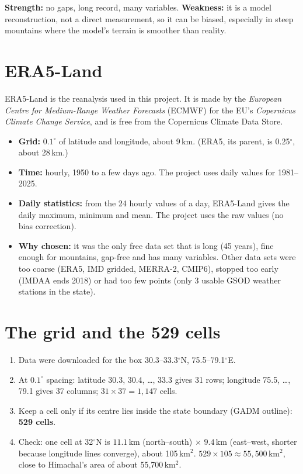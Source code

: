 \textbf{Strength:} no gaps, long record, many variables. \textbf{Weakness:} it is a model reconstruction, not a direct
measurement, so it can be biased, especially in steep mountains where the model's terrain is smoother than reality.

\section{ERA5-Land}
ERA5-Land is the reanalysis used in this project. It is made by the \emph{European Centre for Medium-Range Weather
Forecasts} (ECMWF) for the EU's \emph{Copernicus Climate Change Service}, and is free from the Copernicus Climate Data
Store.
\begin{itemize}
  \item \textbf{Grid:} $0.1^\circ$ of latitude and longitude, about 9\,km. (ERA5, its parent, is 0.25$^\circ$, about
        28\,km.)
  \item \textbf{Time:} hourly, 1950 to a few days ago. The project uses daily values for 1981--2025.
  \item \textbf{Daily statistics:} from the 24 hourly values of a day, ERA5-Land gives the daily maximum, minimum and
        mean. The project uses the raw values (no bias correction).
  \item \textbf{Why chosen:} it was the only free data set that is long (45 years), fine enough for mountains, gap-free
        and has many variables. Other data sets were too coarse (ERA5, IMD gridded, MERRA-2, CMIP6), stopped too early
        (IMDAA ends 2018) or had too few points (only 3 usable GSOD weather stations in the state).
\end{itemize}

\section{The grid and the 529 cells}
\begin{example}
\begin{enumerate}[leftmargin=*]
  \item Data were downloaded for the box 30.3--33.3$^\circ$N, 75.5--79.1$^\circ$E.
  \item At $0.1^\circ$ spacing: latitude 30.3, 30.4, \dots, 33.3 gives 31 rows; longitude 75.5, \dots, 79.1 gives 37
        columns; $31\times37=1{,}147$ cells.
  \item Keep a cell only if its centre lies inside the state boundary (GADM outline): \textbf{529 cells}.
  \item Check: one cell at 32$^\circ$N is $11.1\,\text{km}$ (north--south) $\times$ $9.4\,\text{km}$ (east--west,
        shorter because longitude lines converge), about 105\,km$^2$. $529\times105\approx55{,}500$\,km$^2$, close to
        Himachal's area of about 55{,}700\,km$^2$.
\end{enumerate}
\end{example}

